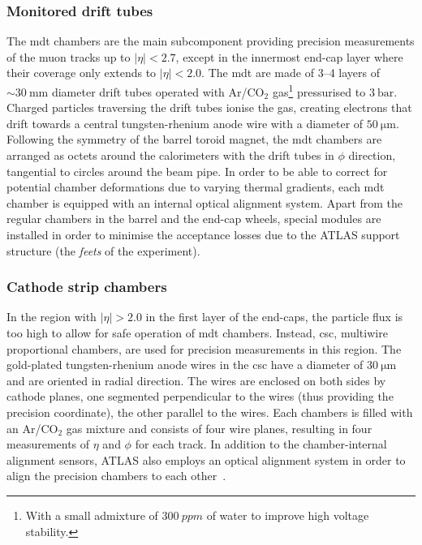 \subsubsection{Monitored drift tubes}

The \gls{mdt} chambers are the main subcomponent providing precision measurements of the muon tracks up to $\vert\eta\vert <2.7$, except in the innermost end-cap layer where their coverage only extends to $\vert\eta\vert <2.0$. The \gls{mdt} are made of 3--4 layers of $\sim \SI{30}{\milli\meter}$ diameter drift tubes operated with Ar/CO$_2$ gas\footnote{With a small admixture of $\SI{300}{ppm}$ of water to improve high voltage stability.} pressurised to $\SI{3}{\bar}$. Charged particles traversing the drift tubes ionise the gas, creating electrons that drift towards a central tungsten-rhenium anode wire with a diameter of $\SI{50}{\micro\meter}$. Following the symmetry of the barrel toroid magnet, the \gls{mdt} chambers are arranged as octets around the calorimeters with the drift tubes in $\phi$ direction, \ie tangential to circles around the beam pipe. In order to be able to correct for potential chamber deformations due to varying thermal gradients, each \gls{mdt} chamber is equipped with an internal optical alignment system. Apart from the regular chambers in the barrel and the end-cap wheels, special modules are installed in order to minimise the acceptance losses due to the ATLAS support structure (the \textit{feets} of the experiment).

\subsubsection{Cathode strip chambers}

In the region with $\vert\eta\vert > 2.0$ in the first layer of the end-caps, the particle flux is too high to allow for safe operation of \gls{mdt} chambers. Instead, \gls{csc}, multiwire proportional chambers, are used for precision measurements in this region. The gold-plated tungsten-rhenium anode wires in the \gls{csc} have a diameter of $\SI{30}{\micro\meter}$ and are oriented in radial direction. The wires are enclosed on both sides by cathode planes, one segmented perpendicular to the wires (thus providing the precision coordinate), the other parallel to the wires. Each chambers is filled with an Ar/CO$_2$ gas mixture and consists of four wire planes, resulting in four measurements of $\eta$ and $\phi$ for each track. In addition to the chamber-internal alignment sensors, ATLAS also employs an optical alignment system in order to align the precision chambers to each other~\cite{Aad:2008zzm}.

